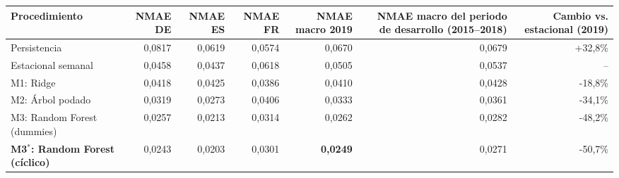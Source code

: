 \begin{tabular}{lrrrrrr}
\toprule
Procedimiento & NMAE DE & NMAE ES & NMAE FR & NMAE macro 2019 & NMAE macro del periodo de desarrollo (2015--2018) & Cambio vs. estacional (2019) \\
\midrule
Persistencia & 0{,}0817 & 0{,}0619 & 0{,}0574 & 0{,}0670 & 0{,}0679 & +32{,}8\% \\
Estacional semanal & 0{,}0458 & 0{,}0437 & 0{,}0618 & 0{,}0505 & 0{,}0537 & -- \\
\midrule
M1: Ridge & 0{,}0418 & 0{,}0425 & 0{,}0386 & 0{,}0410 & 0{,}0428 & -18{,}8\% \\
M2: Árbol podado & 0{,}0319 & 0{,}0273 & 0{,}0406 & 0{,}0333 & 0{,}0361 & -34{,}1\% \\
M3: Random Forest (dummies) & 0{,}0257 & 0{,}0213 & 0{,}0314 & 0{,}0262 & 0{,}0282 & -48{,}2\% \\
\textbf{M3$^\ast$: Random Forest (cíclico)} & 0{,}0243 & 0{,}0203 & 0{,}0301 & \textbf{0{,}0249} & 0{,}0271 & -50{,}7\% \\
\bottomrule
\end{tabular}